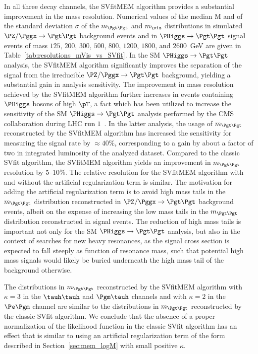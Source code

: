 In all three decay channels, the SVfitMEM algorithm provides a substantial improvement in the mass resolution.
Numerical values of the median $\textrm{M}$ and of the standard deviation $\sigma$ 
of the $m_{\Pgt\Pgt}$ and $m_{\vis}$ distributions in simulated $\PZ/\Pggx \to \Pgt\Pgt$ background events
and in $\PHiggs \to \Pgt\Pgt$ signal events of mass $125$, $200$, $300$, $500$, $800$, $1200$, $1800$, and $2600$~GeV
are given in Table~\ref{tab:resolutions_mVis_vs_SVfit}.
In the SM $\PHiggs \to \Pgt\Pgt$ analysis,
the SVfitMEM algorithm significantly improves the separation of the signal 
from the irreducible $\PZ/\Pggx \to \Pgt\Pgt$ background, yielding a substantial gain in analysis sensitivity.
The improvement in mass resolution achieved by the SVfitMEM algorithm
further increases in events containing $\PHiggs$ bosons of high $\pT$,
a fact which has been utilized to increase the sensitivity of the SM $\PHiggs \to \Pgt\Pgt$ analysis performed by the CMS collaboration during LHC run $1$~\cite{HIG-13-004}.
In the latter analysis, the usage of $m_{\Pgt\Pgt}$ reconstructed by the SVfitMEM algorithm
has increased the sensitivity for measuring the signal rate by $\approx 40\%$,
corresponding to a gain by about a factor of two in integrated luminosity of the analyzed dataset.
Compared to the classic SVfit algorithm, the SVfitMEM algorithm yields an improvement in $m_{\Pgt\Pgt}$ resolution by $5$--$10\%$.
The relative resolution for the SVfitMEM algorithm with and without the artificial regularization term is similar.
The motivation for adding the artificial regularization term is to avoid high mass tails in the $m_{\Pgt\Pgt}$ distribution
reconstructed in $\PZ/\Pggx \to \Pgt\Pgt$ background events,
albeit on the expense of increasing the low mass tails in the $m_{\Pgt\Pgt}$ distribution reconstructed in signal events.
The reduction of high mass tails is important not only for the SM $\PHiggs \to \Pgt\Pgt$ analysis,
but also in the context of searches for new heavy resonances,
as the signal cross section is expected to fall steeply as function of resonance mass,
such that potential high mass signals would likely be buried underneath the high mass tail of the background otherwise.

The distributions in $m_{\Pgt\Pgt}$ reconstructed by the SVfitMEM
algorithm with $\kappa = 3$ in the $\tauh\tauh$ and $\Pgm\tauh$ channels and with $\kappa = 2$ in the $\Pe\Pgm$ channel
are similar to the distributions in $m_{\Pgt\Pgt}$ reconstructed by the classic SVfit algorithm.
We conclude that the absence of a proper normalization of the likelihood function in the classic SVfit algorithm
has an effect that is similar to using an artificial regularization term of the form described in Section~\ref{sec:mem_logM} with small positive $\kappa$.

